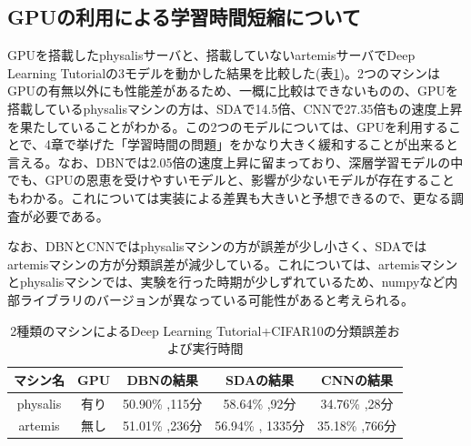 \subsection{GPUの利用による学習時間短縮について}
GPUを搭載したphysalisサーバと、搭載していないartemisサーバでDeep Learning Tutorialの3モデルを動かした結果を比較した(表\ref{c5_gpu_result})。2つのマシンはGPUの有無以外にも性能差があるため、一概に比較はできないものの、GPUを搭載しているphysalisマシンの方は、SDAで14.5倍、CNNで27.35倍もの速度上昇を果たしていることがわかる。この2つのモデルについては、GPUを利用することで、4章で挙げた「学習時間の問題」をかなり大きく緩和することが出来ると言える。なお、DBNでは2.05倍の速度上昇に留まっており、深層学習モデルの中でも、GPUの恩恵を受けやすいモデルと、影響が少ないモデルが存在することもわかる。これについては実装による差異も大きいと予想できるので、更なる調査が必要である。\par
なお、DBNとCNNではphysalisマシンの方が誤差が少し小さく、SDAではartemisマシンの方が分類誤差が減少している。これについては、artemisマシンとphysalisマシンでは、実験を行った時期が少しずれているため、numpyなど内部ライブラリのバージョンが異なっている可能性があると考えられる。

\begin{table}[tdp]
\caption{2種類のマシンによるDeep Learning Tutorial+CIFAR10の分類誤差および実行時間}
\centering
\begin{tabular}{|c|c|c|c|c|}\hline
マシン名 & GPU & DBNの結果 & SDAの結果 & CNNの結果\\ \hline
physalis & 有り & 50.90\% ,115分 & 58.64\% ,92分  & 34.76\% ,28分  \\ \hline
artemis & 無し & 51.01\% ,236分 & 56.94\% , 1335分 & 35.18\% ,766分 \\ \hline
\end{tabular}
\label{c5_gpu_result}
\end{table}